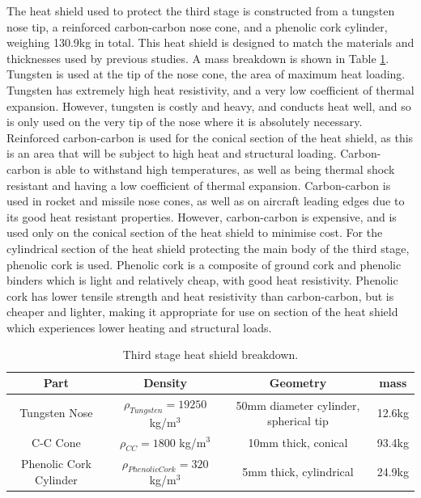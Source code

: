 The heat shield used to protect the third stage is constructed from a tungsten nose tip, a reinforced carbon-carbon nose cone, and a phenolic cork cylinder, weighing 130.9kg in total. This heat shield is designed to match the materials and thicknesses used by previous studies\cite{Preller2017b}. A mass breakdown is shown in Table \ref{tab:heatshield}.
Tungsten is used at the tip of the nose cone, the area of maximum heat loading. Tungsten has extremely high heat resistivity, and a very low coefficient of thermal expansion\cite{tungsten}. However, tungsten is costly and heavy, and conducts heat well, and so is only used on the very tip of the nose where it is absolutely necessary. 
  Reinforced carbon-carbon is used for the conical section of the heat shield, as this is an area that will be subject to high heat and structural loading. Carbon-carbon is able to withstand high temperatures, as well as being thermal shock resistant and having a low coefficient of thermal expansion\cite{Fitzer}. Carbon-carbon is used in rocket and missile nose cones, as well as on aircraft leading edges due to its good heat resistant properties\cite{Fitzer}. However, carbon-carbon is expensive, and is used only on the conical section of the heat shield to minimise cost. For the cylindrical section of the heat shield protecting the main body of the third stage, phenolic cork is used. Phenolic cork is a composite of ground cork and phenolic binders which is light and relatively cheap, with good heat resistivity. Phenolic cork has lower tensile strength and heat resistivity than carbon-carbon\cite{Composites,Fitzer}, but is cheaper and lighter, making it appropriate for use on section of the heat shield which experiences lower heating and structural loads. 

		\begin{table}[h]
			\centering
\begin{tabular}{|c|c|c|c|}
	\hline  Part & Density & Geometry & mass \\ 
	\hline  Tungsten Nose & $\rho_{Tungsten} = 19250$  kg/m$^3$ & 50mm diameter cylinder, spherical tip & 12.6kg \\ 
		\hline C-C Cone & $\rho_{CC} = 1800$  kg/m$^3$ & 10mm thick, conical & 93.4kg \\ 
			\hline Phenolic Cork Cylinder & $\rho_{Phenolic Cork} = 320$  kg/m$^3$ & 5mm thick, cylindrical & 24.9kg \\ 
	\hline 
\end{tabular} 
\caption{Third stage heat shield breakdown.}
\label{tab:heatshield}
\end{table}
		
